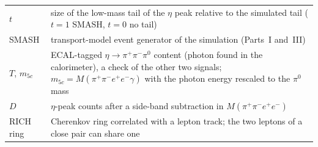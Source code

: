 \documentclass[11pt,a4paper]{article}
\newcommand{\piz}{\ensuremath{\pi^{0}}\xspace}
\newcommand{\pipi}{\ensuremath{\pi^{+}\pi^{-}}\xspace}
\newcommand{\ppee}{\ensuremath{\pi^{+}\pi^{-}e^{+}e^{-}}\xspace}
\newcommand{\Mfour}{\ensuremath{M(\pi^{+}\pi^{-}e^{+}e^{-})}\xspace}
\begin{document}
{\begin{longtable}{@{}>{\raggedright\arraybackslash}p{3.3cm} >{\raggedright\arraybackslash}p{\dimexpr\textwidth-3.3cm-2\tabcolsep\relax}@{}}
$t$ & size of the low-mass tail of the $\eta$ peak relative to the simulated tail ($t=1$ SMASH, $t=0$ no tail) \\
SMASH & transport-model event generator of the simulation (Parts~I and~III) \\
$T$, $m_{5c}$ & ECAL-tagged $\eta\to\pipi\piz$ content (photon found in the calorimeter), a check of the other two signals; $m_{5c}=M(\ppee\gamma)$ with the photon energy rescaled to the \piz mass \\
$D$ & $\eta$-peak counts after a side-band subtraction in \Mfour \\
RICH ring & Cherenkov ring correlated with a lepton track; the two leptons of a close pair can share one \\
\bottomrule
\end{longtable}
}
\end{document}

